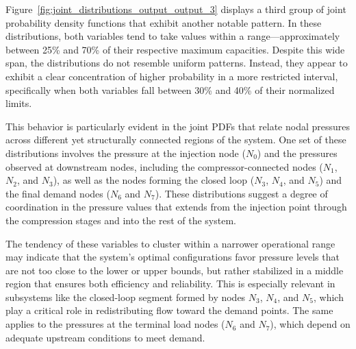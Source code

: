 Figure~\ref{fig:joint_distributions_output_output_3} displays a third group of joint probability density functions that exhibit another notable pattern. In these distributions, both variables tend to take values within a range—approximately between 25\% and 70\% of their respective maximum capacities. Despite this wide span, the distributions do not resemble uniform patterns. Instead, they appear to exhibit a clear concentration of higher probability in a more restricted interval, specifically when both variables fall between 30\% and 40\% of their normalized limits.

This behavior is particularly evident in the joint PDFs that relate nodal pressures across different yet structurally connected regions of the system. One set of these distributions involves the pressure at the injection node ($N_0$) and the pressures observed at downstream nodes, including the compressor-connected nodes ($N_1$, $N_2$, and $N_3$), as well as the nodes forming the closed loop ($N_3$, $N_4$, and $N_5$) and the final demand nodes ($N_6$ and $N_7$). These distributions suggest a degree of coordination in the pressure values that extends from the injection point through the compression stages and into the rest of the system.

The tendency of these variables to cluster within a narrower operational range may indicate that the system's optimal configurations favor pressure levels that are not too close to the lower or upper bounds, but rather stabilized in a middle region that ensures both efficiency and reliability. This is especially relevant in subsystems like the closed-loop segment formed by nodes $N_3$, $N_4$, and $N_5$, which play a critical role in redistributing flow toward the demand points. The same applies to the pressures at the terminal load nodes ($N_6$ and $N_7$), which depend on adequate upstream conditions to meet demand.



